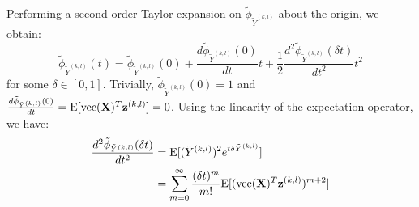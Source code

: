 \begin{IEEEproof}
Performing a second order Taylor expansion on $\tilde{\phi}_{\tilde{Y}^{(k,l)}}$ about the origin, we obtain:
\begin{equation*}
	\tilde{\phi}_{\tilde{Y}^{(k,l)}}(t) = \tilde{\phi}_{\tilde{Y}^{(k,l)}}(0) + \frac{d\tilde{\phi}_{\tilde{Y}^{(k,l)}}(0)}{dt} t + \frac{1}{2} \frac{d^2 \tilde{\phi}_{\tilde{Y}^{(k,l)}}(\delta t)}{dt^2} t^2
\end{equation*}
for some $\delta \in[0,1]$. Trivially, $ \tilde{\phi}_{\tilde{Y}^{(k,l)}}(0)=1$ and $\frac{d\tilde{\phi}_{\tilde{Y}^{(k,l)}}(0)}{dt}={\rm E}[{ \text{vec} }({\mathbf{X}})^T { \mathbf{z} }^{(k,l)}]=0$. Using the linearity of the expectation operator, we have:
\begin{align*}
	\frac{d^2 \tilde{\phi}_{\tilde{Y}^{(k,l)}}(\delta t)}{dt^2} &= {\rm E}[(\tilde{Y}^{(k,l)})^2 e^{t \delta \tilde{Y}^{(k,l)}}] \\
			&= \sum_{m=0}^\infty \frac{(\delta t)^m}{m!} {\rm E}[({ \text{vec} }({\mathbf{X}})^T { \mathbf{z} }^{(k,l)})^{m+2}]
\end{align*}


\end{IEEEproof}
